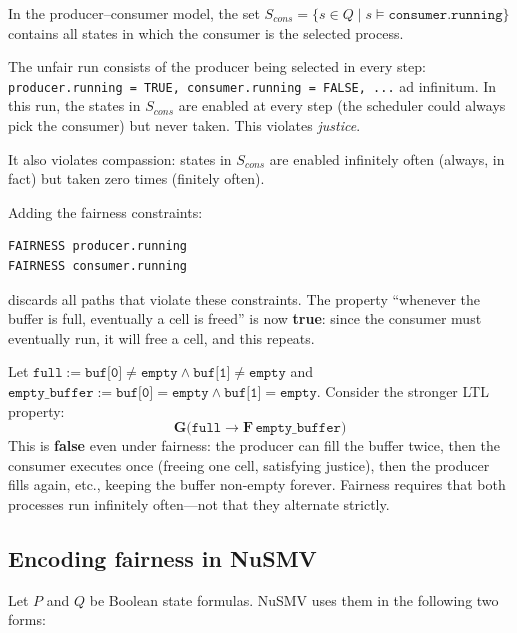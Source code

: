 \begin{example}
\label{ex:prod-cons-fairness}
In the producer--consumer model, the set
$S_{\mathit{cons}} =
\{s \in Q \mid s \models \texttt{consumer.running}\}$ contains all states
in which the consumer is the selected process.

The unfair run consists of the producer being selected in every step:
\texttt{producer.running = TRUE, consumer.running = FALSE, ...} ad
infinitum.  In this run, the states in $S_{\mathit{cons}}$ are enabled at
every step (the scheduler could always pick the consumer) but never taken.
This violates \emph{justice}.

It also violates compassion: states in $S_{\mathit{cons}}$ are enabled
infinitely often (always, in fact) but taken zero times (finitely often).

Adding the fairness constraints:
\begin{verbatim}
FAIRNESS producer.running
FAIRNESS consumer.running
\end{verbatim}
discards all paths that violate these constraints.  The property
``whenever the buffer is full, eventually a cell is freed'' is now
\textbf{true}: since the consumer must eventually run, it will free a cell,
and this repeats.
\end{example}

\begin{example}
Let
\(\texttt{full} := \texttt{buf[0]}\neq\texttt{empty}\wedge
\texttt{buf[1]}\neq\texttt{empty}\) and
\(\texttt{empty\_buffer} := \texttt{buf[0]}=\texttt{empty}\wedge
\texttt{buf[1]}=\texttt{empty}\).  Consider the stronger LTL property:
\[
  \mathbf{G}\bigl(\texttt{full} \to \mathbf{F}\,\texttt{empty\_buffer}\bigr)
\]
This is \textbf{false} even under fairness: the producer can fill the buffer
twice, then the consumer
executes once (freeing one cell, satisfying justice), then the producer
fills again, etc., keeping the buffer non-empty forever.  Fairness requires
that both processes run infinitely often---not that they alternate strictly.
\end{example}

\subsection{Encoding fairness in NuSMV}

Let \(P\) and \(Q\) be Boolean state formulas.  NuSMV uses them in the
following two forms:

